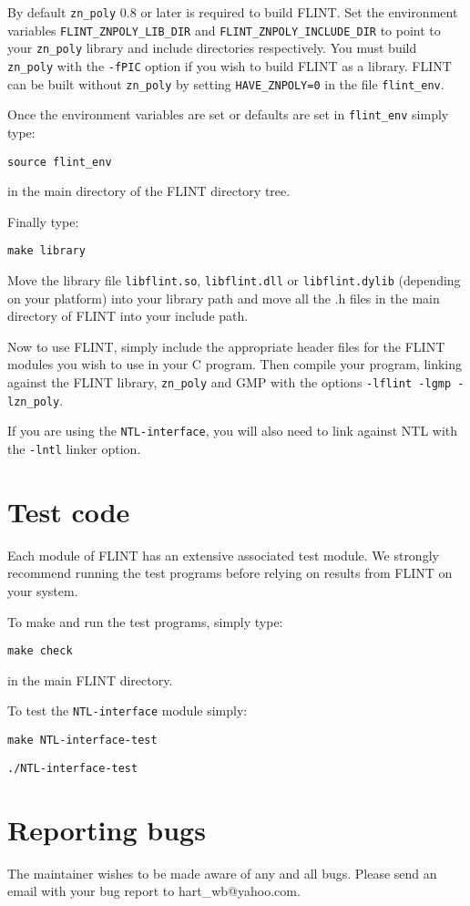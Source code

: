\documentclass[a4paper,10pt]{article}
\newcommand{\code}{\lstinline}
\begin{document}
By default \code{zn_poly} 0.8 or later is required to build FLINT. Set the environment variables \code{FLINT_ZNPOLY_LIB_DIR} and \code{FLINT_ZNPOLY_INCLUDE_DIR} to point to your \code{zn_poly} library and include directories respectively. You must build \code{zn_poly} with the \code{-fPIC} option if you wish to build FLINT as a library. FLINT can be built without \code{zn_poly} by setting \code{HAVE_ZNPOLY=0} in the file \code{flint_env}.

Once the environment variables are set or defaults are set in \code{flint_env} simply type:

\code{source flint_env}

in the main directory of the FLINT directory tree. 

Finally type:

\code{make library}

Move the library file \code{libflint.so}, \code{libflint.dll} or \code{libflint.dylib} (depending on your platform) into your library path and move all the .h files in the main directory of FLINT into your include path.

Now to use FLINT, simply include the appropriate header files for the FLINT modules you wish to use in your C program. Then compile your program, linking against the FLINT library, \code{zn_poly} and GMP with the options \code{-lflint -lgmp -lzn_poly}.

If you are using the \code{NTL-interface}, you will also need to link against NTL with the \code{-lntl} linker option.

\section{Test code}
Each module of FLINT has an extensive associated test module. We strongly recommend running the test programs before relying on results from FLINT on your system. 

To make and run the test programs, simply type:

\code{make check}

in the main FLINT directory.

To test the \code{NTL-interface} module simply:

\code{make NTL-interface-test}

\code{./NTL-interface-test}

\section{Reporting bugs}
The maintainer wishes to be made aware of any and all bugs. Please send an email with your bug report to hart\_wb@yahoo.com.
\end{document}
